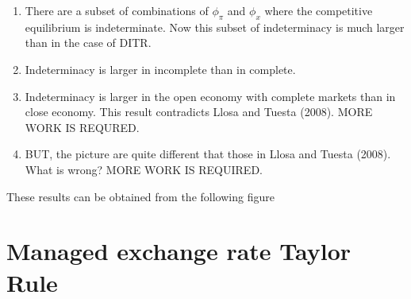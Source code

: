 \documentclass{article}
\begin{document}
\begin{enumerate}
\item There are a subset of combinations of $\phi _{\pi }$ and $\phi _{x}$
where the competitive equilibrium is indeterminate. Now this subset of
indeterminacy is much larger than in the case of DITR.

\item Indeterminacy is larger in incomplete than in complete.

\item Indeterminacy is larger in the open economy with complete markets than
in close economy. This result contradicts Llosa and Tuesta (2008). MORE WORK
IS REQURED.

\item BUT, the picture are quite different that those in Llosa and Tuesta
(2008). What is wrong? MORE WORK IS REQUIRED.
\end{enumerate}

These results can be obtained from the following figure%

\section{Managed exchange rate Taylor Rule}
\end{document}
